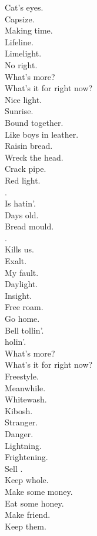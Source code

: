 Cat's eyes. \\
Capsize. \\
Making time. \\
Lifeline. \\
Limelight. \\
No right. \\

What's more? \\
What's it for right now? \\

Nice light. \\
Sunrise. \\
Bound together. \\
Like boys in leather. \\
Raisin bread. \\
Wreck the head. \\
Crack pipe. \\
Red light. \\

. \\
Is hatin'. \\
Days old. \\
Bread mould. \\
. \\
Kills us. \\
Exalt. \\
My fault. \\

Daylight. \\
Insight. \\
Free roam. \\
Go home. \\
Bell tollin'. \\
 holin'. \\

What's more? \\
What's it for right now? \\

Freestyle. \\
Meanwhile. \\
Whitewash. \\
Kibosh. \\
Stranger. \\
Danger. \\
Lightning. \\
Frightening. \\

Sell . \\
Keep whole. \\
Make some money. \\
Eat some honey. \\
Make friend. \\
Keep them. \\

